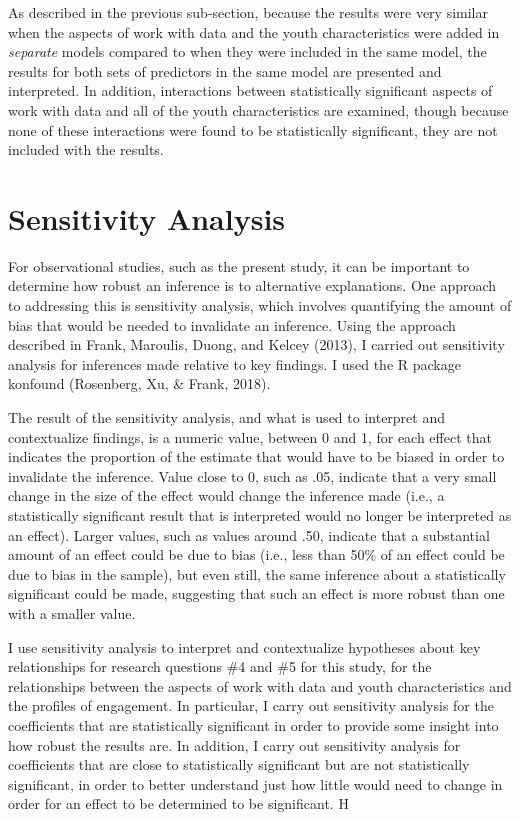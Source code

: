 \documentclass[]{msu-thesis}
\theoremstyle{definition}
\theoremstyle{definition}
\theoremstyle{definition}
\theoremstyle{remark}
\begin{document}
As described in the previous sub-section, because the results were very
similar when the aspects of work with data and the youth characteristics
were added in \emph{separate} models compared to when they were included
in the same model, the results for both sets of predictors in the same
model are presented and interpreted. In addition, interactions between
statistically significant aspects of work with data and all of the youth
characteristics are examined, though because none of these interactions
were found to be statistically significant, they are not included with
the results.

\section{Sensitivity Analysis}\label{sensitivity-analysis}

For observational studies, such as the present study, it can be
important to determine how robust an inference is to alternative
explanations. One approach to addressing this is sensitivity analysis,
which involves quantifying the amount of bias that would be needed to
invalidate an inference. Using the approach described in Frank,
Maroulis, Duong, and Kelcey (2013), I carried out sensitivity analysis
for inferences made relative to key findings. I used the R package
konfound (Rosenberg, Xu, \& Frank, 2018).

The result of the sensitivity analysis, and what is used to interpret
and contextualize findings, is a numeric value, between 0 and 1, for
each effect that indicates the proportion of the estimate that would
have to be biased in order to invalidate the inference. Value close to
0, such as .05, indicate that a very small change in the size of the
effect would change the inference made (i.e., a statistically
significant result that is interpreted would no longer be interpreted as
an effect). Larger values, such as values around .50, indicate that a
substantial amount of an effect could be due to bias (i.e., less than
50\% of an effect could be due to bias in the sample), but even still,
the same inference about a statistically significant could be made,
suggesting that such an effect is more robust than one with a smaller
value.

I use sensitivity analysis to interpret and contextualize hypotheses
about key relationships for research questions \#4 and \#5 for this
study, for the relationships between the aspects of work with data and
youth characteristics and the profiles of engagement. In particular, I
carry out sensitivity analysis for the coefficients that are
statistically significant in order to provide some insight into how
robust the results are. In addition, I carry out sensitivity analysis
for coefficients that are close to statistically significant but are not
statistically significant, in order to better understand just how little
would need to change in order for an effect to be determined to be
significant. H
\end{document}
